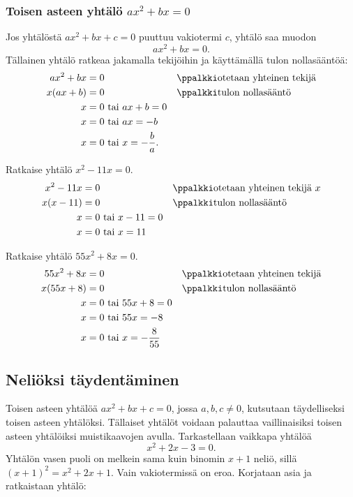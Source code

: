 \subsubsection*{Toisen asteen yhtälö $ax^2+bx=0$}
Jos yhtälöstä $ax^2+bx+c=0$ puuttuu vakiotermi $c$, yhtälö saa muodon 
$$ax^2+bx=0.$$ Tällainen yhtälö ratkeaa jakamalla tekijöihin ja käyttämällä tulon nollasääntöä:
\begin{align*}
ax^2+bx&=0 \ \ \ \ \ &&\ppalkki\text{otetaan yhteinen tekijä} \\
x(ax+b)&=0 \ \ \ \ \ &&\ppalkki\text{tulon nollasääntö} \\
x&=0 \text{ tai } ax+b=0 \\
x&=0 \text{ tai } ax=-b \\
x&=0 \text{ tai } x=-\frac{b}{a}.
\end{align*}
\begin{esimerkki}
Ratkaise yhtälö $x^2-11x=0$.
\begin{align*}
x^2-11x&=0 \ \ \ \ \  &&\ppalkki\text{otetaan yhteinen tekijä } x\\
x(x-11)&=0 \ \ \ \ \ &&\ppalkki\text{tulon nollasääntö} \\
x&=0 \text{ tai } x-11=0 \\
x&=0 \text{ tai } x=11
\end{align*}
\end{esimerkki}

\begin{esimerkki}
Ratkaise yhtälö $55x^2+8x=0$.
\begin{align*}
55x^2+8x&=0 \ \ \ \ \ &&\ppalkki\text{otetaan yhteinen tekijä} \\
x(55x+8)&=0 \ \ \ \ \ &&\ppalkki\text{tulon nollasääntö} \\
x&=0 \text{ tai } 55x+8=0 \\
x&=0 \text{ tai } 55x=-8 \\
x&=0 \text{ tai } x=-\frac{8}{55}
\end{align*}
\end{esimerkki}

\subsection*{Neliöksi täydentäminen}
Toisen asteen yhtälöä $ax^2+bx+c=0$, jossa $a,b,c \neq 0$, kutsutaan
täydelliseksi toisen asteen yhtälöksi. Tällaiset yhtälöt voidaan palauttaa
vaillinaisiksi toisen asteen yhtälöiksi muistikaavojen avulla.
Tarkastellaan vaikkapa yhtälöä
\[x^2+2x-3=0.\]
Yhtälön vasen puoli on melkein sama kuin binomin $x+1$ neliö, sillä $(x+1)^2=x^2+2x+1$.
Vain vakiotermissä on eroa. Korjataan asia ja ratkaistaan yhtälö:

